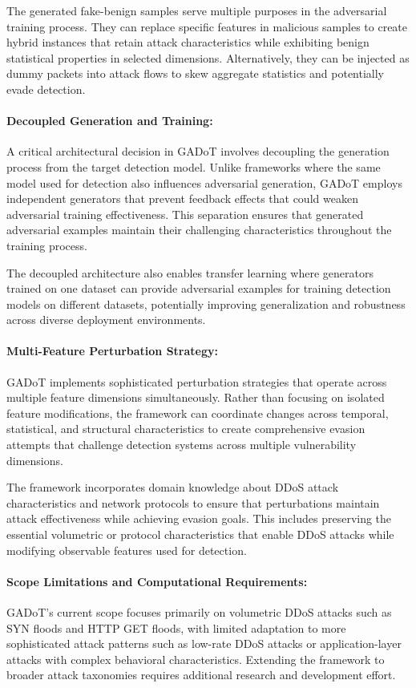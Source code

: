 The generated fake-benign samples serve multiple purposes in the adversarial training process. They can replace specific features in malicious samples to create hybrid instances that retain attack characteristics while exhibiting benign statistical properties in selected dimensions. Alternatively, they can be injected as dummy packets into attack flows to skew aggregate statistics and potentially evade detection.

\paragraph{Decoupled Generation and Training:}
A critical architectural decision in GADoT involves decoupling the generation process from the target detection model. Unlike frameworks where the same model used for detection also influences adversarial generation, GADoT employs independent generators that prevent feedback effects that could weaken adversarial training effectiveness. This separation ensures that generated adversarial examples maintain their challenging characteristics throughout the training process.

The decoupled architecture also enables transfer learning where generators trained on one dataset can provide adversarial examples for training detection models on different datasets, potentially improving generalization and robustness across diverse deployment environments.

\paragraph{Multi-Feature Perturbation Strategy:}
GADoT implements sophisticated perturbation strategies that operate across multiple feature dimensions simultaneously. Rather than focusing on isolated feature modifications, the framework can coordinate changes across temporal, statistical, and structural characteristics to create comprehensive evasion attempts that challenge detection systems across multiple vulnerability dimensions.

The framework incorporates domain knowledge about DDoS attack characteristics and network protocols to ensure that perturbations maintain attack effectiveness while achieving evasion goals. This includes preserving the essential volumetric or protocol characteristics that enable DDoS attacks while modifying observable features used for detection.

\paragraph{Scope Limitations and Computational Requirements:}
GADoT's current scope focuses primarily on volumetric DDoS attacks such as SYN floods and HTTP GET floods, with limited adaptation to more sophisticated attack patterns such as low-rate DDoS attacks or application-layer attacks with complex behavioral characteristics. Extending the framework to broader attack taxonomies requires additional research and development effort.


